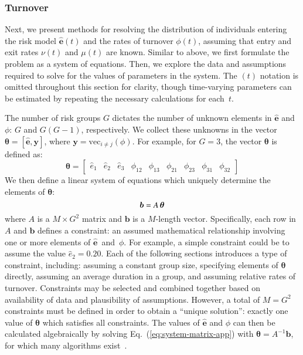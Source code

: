\subsubsection{Turnover}
\label{aaa:params-turnover}
Next, we present methods for resolving
the distribution of individuals entering the risk model $\bm{\hat{e}}(t)$ and
the rates of turnover $\phi(t)$,
assuming that entry and exit rates $\nu(t)$ and $\mu(t)$ are known.
Similar to above, we first formulate the problem as a system of equations.
Then, we explore the data and assumptions required
to solve for the values of parameters in the system.
The $(t)$ notation is omitted throughout this section for clarity,
though time-varying parameters can be estimated by
repeating the necessary calculations for each~$t$.
\par
The number of risk groups $G$ dictates the number of
unknown elements in $\bm{\hat{e}}$ and $\phi$: $G$ and $G(G-1)$, respectively.
We collect these unknowns in the vector
$\bm{\theta} = \left[\bm{\hat{e}}, \bm{y}\right]$,
where $\bm{y} = \mathrm{vec}_{i \ne j}(\phi)$.
For example, for $G = 3$, the vector $\bm{\theta}$ is defined as:
\begin{equation}
\bm{\theta} = \left[
\begin{array}{ccccccccc}
\hat{e}_1 & \hat{e}_2 & \hat{e}_3 & \phi_{12} & \phi_{13} & \phi_{21} & \phi_{23} & \phi_{31} & \phi_{32}
\end{array}\right]
\end{equation}
We then define a linear system of equations
which uniquely determine the elements of $\bm{\theta}$:
\begin{equation}\label{eq:system-matrix-app}
\bm{b} = A \thinspace \bm{\theta}
\end{equation}
where $A$ is a $M \times G^2$ matrix
and $\bm{b}$ is a $M$-length vector.
Specifically, each row in $A$ and $\bm{b}$ defines a constraint:
an assumed mathematical relationship involving one or more elements of
$\bm{\hat{e}}$~and~$\phi$.
For example, a simple constraint could be to assume the value $\hat{e}_2 = 0.20$.
Each of the following sections introduces a type of constraint, including:
assuming a constant group size,
specifying elements of $\bm{\theta}$ directly,
assuming an average duration in a group,
and assuming relative rates of turnover.
Constraints may be selected and combined together based on
availability of data and plausibility of assumptions.
However, a total of $M = G^2$ constraints must be defined
in order to obtain a ``unique solution'':
exactly one value of $\bm{\theta}$ which satisfies all constraints.
The values of $\bm{\hat{e}}$ and $\phi$
can then be calculated algebraically by solving Eq.~(\ref{eq:system-matrix-app})
with $\bm{\theta} = A^{-1}\bm{b}$,
for which many algorithms exist~\citep{LAPACK}.
